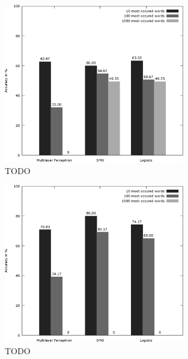 \begin{figure}
	\label{fig:product_feature_selection_with_none}
	\begin{center}
		\includegraphics[width=0.7\textwidth]{figures/product_feature_selection_with_none.eps}
	\end{center}
	\caption{TODO}
\end{figure}

\begin{figure}
	\label{fig:product_feature_selection_without_none}
	\begin{center}
		\includegraphics[width=0.7\textwidth]{figures/product_feature_selection_without_none.eps}
	\end{center}
	\caption{TODO}
\end{figure}

